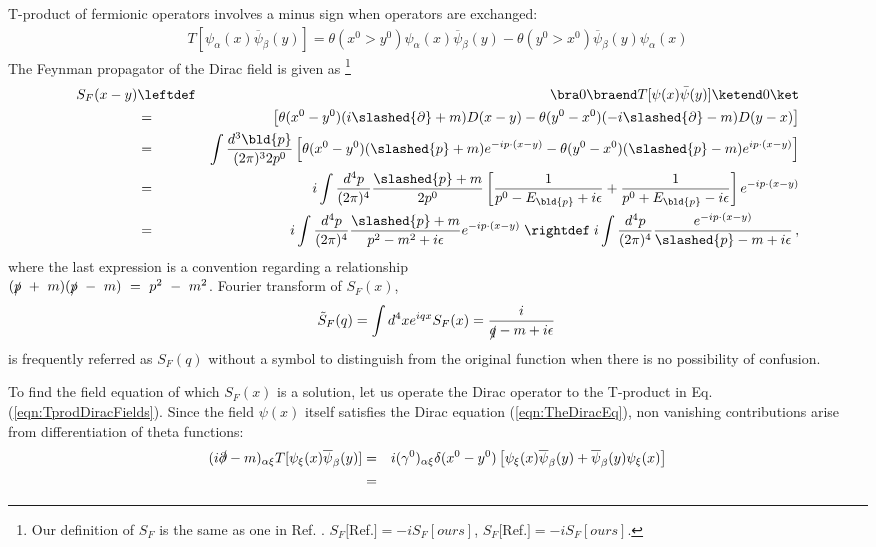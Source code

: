 T-product of fermionic operators involves a minus sign 
when operators are exchanged:
\begin{eqnarray}
T[\psi_\alpha(x) \overline{\psi}_\beta(y)] =
\theta(x^0 > y^0) \psi_\alpha(x) \overline{\psi}_\beta(y)
-
\theta(y^0 > x^0)  \overline{\psi}_\beta(y) \psi_\alpha(x)
\label{eqn:TprodDiracFields}
\end{eqnarray}
The Feynman propagator of the Dirac field is given as
\footnote{%
Our definition of $S_F$ is the same as one in Ref. \cite{ref:Tong}.
$S_F[$Ref.\cite{ref:Itzykson-Zuber}$] = -i S_F[ours]$,
$S_F[$Ref.\cite{ref:Mandl-Shaw}$] = -iS_F[ours]$.
}%
\begin{eqnarray}
S_F(x-y) &\leftdef&
\bra 0 \braend T[\psi(x) \bar{\psi}(y)] \ketend 0 \ket
\nonumber\\
&=&
\left[ \theta(x^0 - y^0) (i \slashed{\partial} + m) D(x-y)
-
\theta(y^0 - x^0) (-i \slashed{\partial} - m) D(y-x)
\right]
\nonumber\\
&=&
\int \frac{d^3 \bld{p}}{(2\pi)^3 2 p^0} 
\left[
\theta(x^0 - y^0) (\slashed{p} + m)  e^{-ip \cdot ( x - y)}  -
\theta(y^0 - x^0) (\slashed{p} - m) e^{ip \cdot ( x - y)} 
\right]  
\nonumber\\
&=&
i \int \frac{d^4 p}{(2\pi)^4} \frac{\slashed{p} + m}{2 p^0}
\left[
\frac{1}{p^0 - E_{\bld{p}} + i\epsilon}  +
\frac{1}{p^0 + E_{\bld{p}} - i\epsilon} 
\right]  e^{-ip \cdot ( x - y)} 
\nonumber\\
&=&
i \int \frac{d^4 p}{(2\pi)^4} \frac{\slashed{p} + m}{p^2 - m^2 + i\epsilon}
e^{-ip \cdot ( x - y)} 
\;\rightdef\;
i \int \frac{d^4 p}{(2\pi)^4} \frac{ e^{-ip \cdot ( x - y)}  }{\slashed{p} - m + i\epsilon}\,,
\label{eqn:DefFeynmanPropDirac}
\end{eqnarray}
where the last expression is a convention regarding 
a relationship\\ 
$(\slashed{p}~+~m)(\slashed{p}~-~m)~=~p^2~-~m^2$.
Fourier transform of $S_F(x)$,
\begin{eqnarray}
\tilde{S}_F(q) 
=
\int d^4x e^{iqx} S_F(x)
=
\frac{i}{\slashed{q} - m + i\epsilon}\,
\label{eqn:DiracPropMomRep}
\end{eqnarray}
is frequently referred as $S_F(q)$ without a symbol to distinguish
from the original function
when there is no possibility of confusion. 

To find the field equation of which  $S_F(x)$ is a solution, let us
operate the Dirac operator to the T-product in Eq. (\ref{eqn:TprodDiracFields}).
Since the field $\psi(x)$ itself satisfies the Dirac equation (\ref{eqn:TheDiracEq}),
non vanishing contributions arise from differentiation of theta functions:
\begin{eqnarray}
(i \slashed{\partial} - m)_{\alpha \xi} T[\psi_\xi(x) \overline{\psi}_\beta(y)] 
&=&
i (\gamma^0)_{\alpha \xi} \delta(x^0 - y^0)
\left[
\psi_\xi(x) \overline{\psi}_\beta(y)
+
\overline{\psi}_\beta(y) \psi_\xi(x) 
\right]
\nonumber\\
&=&
\end{eqnarray}






